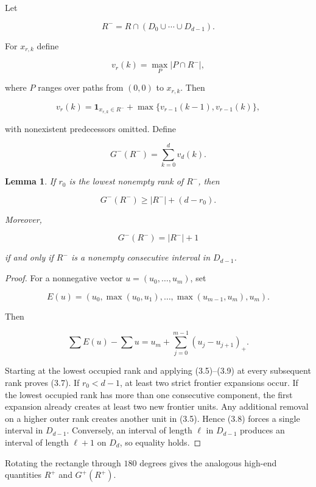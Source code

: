 \documentclass[11pt]{article}
\newtheorem{lemma}[theorem]{Lemma}
\numberwithin{equation}{section}
\begin{document}
Let

\nopagebreak[4]
\[
R^-=R\cap(D_0\cup\cdots\cup D_{d-1}).
\]

For $x_{r,k}$ define

\nopagebreak[4]
\[
v_r(k)=
\max_P |P\cap R^-|,
\tag{3.4}
\]

where $P$ ranges over paths from $(0,0)$ to $x_{r,k}$. Then

\nopagebreak[4]
\[
v_r(k)=\mathbf1_{x_{r,k}\in R^-}
+\max\{v_{r-1}(k-1),v_{r-1}(k)\},
\tag{3.5}
\]

with nonexistent predecessors omitted. Define

\nopagebreak[4]
\[
G^-(R^-)=\sum_{k=0}^{d}v_d(k).
\tag{3.6}
\]

\Needspace{0.25\textheight}
\begin{lemma}

If $r_0$ is the lowest nonempty rank of $R^-$, then

\nopagebreak[4]
\[
G^-(R^-)\ge |R^-|+(d-r_0).
\tag{3.7}
\]

Moreover,

\nopagebreak[4]
\[
G^-(R^-)=|R^-|+1
\tag{3.8}
\]

if and only if $R^-$ is a nonempty consecutive interval in $D_{d-1}$.

\end{lemma}

\begin{proof}

For a nonnegative vector $u=(u_0,\ldots,u_m)$, set

\nopagebreak[4]
\[
E(u)=
(u_0,\max(u_0,u_1),\ldots,\max(u_{m-1},u_m),u_m).
\]

Then

\nopagebreak[4]
\[
\sum E(u)-\sum u
=u_m+\sum_{j=0}^{m-1}(u_j-u_{j+1})_+.
\tag{3.9}
\]

Starting at the lowest occupied rank and applying (3.5)--(3.9) at every
subsequent rank proves (3.7). If $r_0<d-1$, at least two strict frontier
expansions occur. If the lowest occupied rank has more than one consecutive
component, the first expansion already creates at least two new frontier
units. Any additional removal on a higher outer rank creates another unit in
(3.5). Hence (3.8) forces a single interval in $D_{d-1}$. Conversely, an
interval of length $\ell$ in $D_{d-1}$ produces an interval of length
$\ell+1$ on $D_d$, so equality holds.
\end{proof}


Rotating the rectangle through $180$ degrees gives the analogous high-end
quantities $R^+$ and $G^+(R^+)$.
\end{document}
